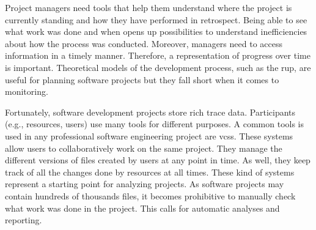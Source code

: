 
Project managers need tools that help them understand where the project is currently standing and how they have performed in retrospect. Being able to see what work was done and when opens up possibilities to understand inefficiencies about how the process was conducted. Moreover, managers need to access information in a timely manner. Therefore, a representation of progress over time is important. Theoretical models of the development process, such as the \gls{rup}, are useful for planning software projects but they fall short when it comes to monitoring.

Fortunately, software development projects store rich trace data. Participants (e.g., resources, users) use many tools for different purposes. A common tools is used in any professional software engineering project are \glspl{vcs}. These systems allow users to collaboratively work on the same project. They manage the different versions of files created by users at any point in time. As well, they keep track of all the changes done by resources at all times. These kind of systems represent a starting point for analyzing projects. As software projects may contain hundreds of thousands files, it becomes prohibitive to manually check what work was done in the project. This calls for automatic analyses and reporting. 

